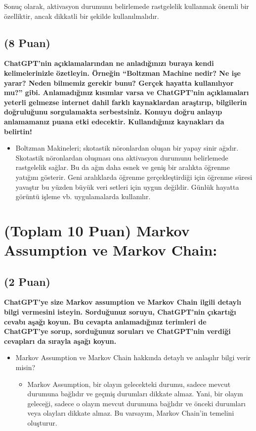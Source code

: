 \documentclass[11pt]{article}
\begin{document}
\begin{itemize}
\begin{itemize}
{Sonuç olarak, aktivasyon durumunu belirlemede rastgelelik kullanmak önemli bir özelliktir, ancak dikkatli bir şekilde kullanılmalıdır.}
        \end{itemize}

\subsection{(8 Puan)} \textbf{ChatGPT’nin açıklamalarından ne anladığınızı buraya kendi kelimelerinizle özetleyin. Örneğin ``Boltzman Machine nedir? Ne işe yarar? Neden bilmemiz gerekir bunu? Gerçek hayatta kullanılıyor mu?'' gibi. Anlamadığınız kısımlar varsa ve ChatGPT’nin açıklamaları yeterli gelmezse internet dahil farklı kaynaklardan araştırıp, bilgilerin doğruluğunu sorgulamakta serbestsiniz. Konuyu doğru anlayıp anlamamanız puana etki edecektir. Kullandığınız kaynakları da belirtin!}

\begin{itemize}
    \item{Boltzman Makineleri; skotastik nöronlardan oluşan bir yapay sinir ağıdır. Skotastik nöronlardan oluşması ona aktivasyon durumunu belirlemede rastgelelik sağlar. Bu da ağın daha esnek ve geniş bir aralıkta öğrenme yatığını gösterir. Geni aralıklarda öğrenme gerçekleştirdiği için öğrenme süresi yavaştır bu yüzden büyük veri setleri için uygun değildir. Günlük hayatta görüntü işleme vb. uygulamalarda kullanılır.}
\end{itemize}

\section{(Toplam 10 Puan) Markov Assumption ve Markov Chain:}

\subsection{(2 Puan)} \textbf{ChatGPT’ye size Markov assumption ve Markov Chain ilgili detaylı bilgi vermesini isteyin. Sorduğunuz soruyu, ChatGPT'nin çıkartığı cevabı aşağı koyun. Bu cevapta anlamadığınız terimleri de ChatGPT’ye sorup, sorduğunuz soruları ve ChatGPT’nin verdiği cevapları da sırayla aşağı koyun.}

\begin{itemize}
        \item {Markov Assumption ve Markov Chain hakkında detaylı ve anlaşılır bilgi verir misin?}
        \begin{itemize}
            \item {Markov Assumption, bir olayın gelecekteki durumu, sadece mevcut durumuna bağlıdır ve geçmiş durumları dikkate almaz. Yani, bir olayın geleceği, sadece o olayın mevcut durumuna bağlıdır ve önceki durumları veya olayları dikkate almaz. Bu varsayım, Markov Chain'in temelini oluşturur.

}
\end{itemize}
\end{itemize}
\end{itemize}
\end{document}
